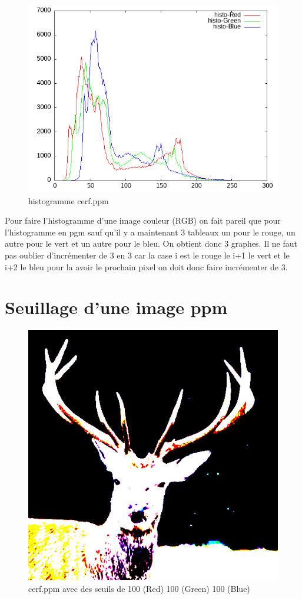 \documentclass{article}
\begin{document}
\begin{figure}[h]
\centerline{\includegraphics[scale=0.5]{./rendus/histoppmcerf.png}}
\caption{histogramme cerf.ppm}
\end{figure}

Pour faire l'histogramme d'une image couleur (RGB) on fait pareil que pour l'histogramme en pgm sauf qu'il y a maintenant 3 tableaux un pour le rouge, un autre pour le vert et un autre pour le bleu. On obtient donc 3 graphes. Il ne faut pas oublier d'incrémenter de 3 en 3 car la case i est le rouge le i+1 le vert et le i+2 le bleu pour la avoir le prochain pixel on doit donc faire incrémenter de 3.

\newpage
\section{Seuillage d'une image ppm}

\begin{figure}[h]
\centerline{\includegraphics[scale=0.6]{./rendus/cerfSeuilppm.png}}
\caption{cerf.ppm avec des seuils de 100 (Red) 100 (Green) 100 (Blue)}
\end{figure}
\end{document}
